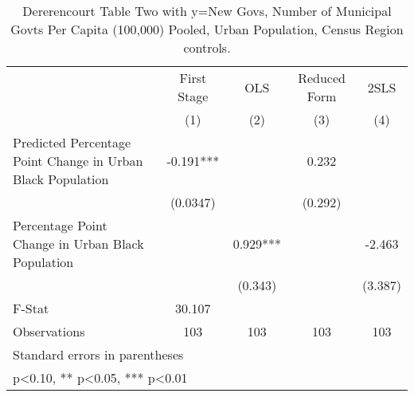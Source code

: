 \begin{table}[htbp]\centering
\def\sym#1{\ifmmode^{#1}\else\(^{#1}\)\fi}
\caption{Dererencourt Table Two with y=New Govs, Number of Municipal Govts Per Capita (100,000) Pooled, Urban Population, Census Region controls.}
\begin{tabular}{l*{4}{c}}
\toprule
                    & First Stage   &         OLS   &Reduced Form   &        2SLS   \\
                    &\multicolumn{1}{c}{(1)}   &\multicolumn{1}{c}{(2)}   &\multicolumn{1}{c}{(3)}   &\multicolumn{1}{c}{(4)}   \\
\midrule
Predicted Percentage Point Change in Urban Black Population&      -0.191***&               &       0.232   &               \\
                    &    (0.0347)   &               &     (0.292)   &               \\
\addlinespace
Percentage Point Change in Urban Black Population&               &       0.929***&               &      -2.463   \\
                    &               &     (0.343)   &               &     (3.387)   \\
\midrule
F-Stat              &      30.107   &               &               &               \\
Observations        &         103   &         103   &         103   &         103   \\
\bottomrule
\multicolumn{5}{l}{\footnotesize Standard errors in parentheses}\\
\multicolumn{5}{l}{\footnotesize * p<0.10, ** p<0.05, *** p<0.01}\\
\end{tabular}
\end{table}
